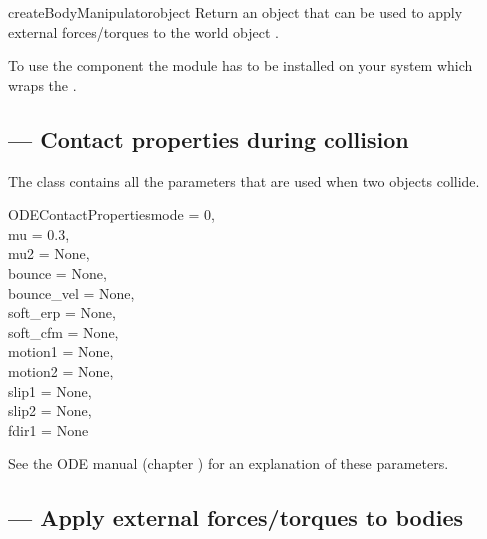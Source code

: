 \begin{methoddesc}{createBodyManipulator}{object}
Return an  object that can be used to apply
external forces/torques to the world object .
\end{methoddesc}


\begin{notice}[note]
To use the  component the
 module has to be 
installed on your system which wraps the 
.
\end{notice}

\subsection{ ---
         Contact properties during collision}

The  class contains all the parameters
that are used when two objects collide. 

\begin{classdesc}{ODEContactProperties}{mode = 0,\\
			       mu = 0.3,\\
			       mu2 = None,\\
			       bounce = None,\\
			       bounce_vel = None,\\
			       soft_erp = None,\\
			       soft_cfm = None,\\
			       motion1 = None,\\
			       motion2 = None,\\
			       slip1 = None,\\
			       slip2 = None,\\
			       fdir1 = None}

See the ODE manual (chapter 
)
for an explanation of these
parameters.

\end{classdesc}

\subsection{ ---
         Apply external forces/torques to bodies}

